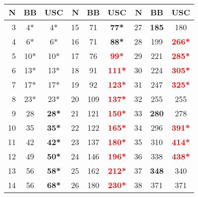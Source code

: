 \begin{table}[t]\scriptsize
\begin{tabular}{r|cc||r|cc||r|cc}
 \hline
 N&BB &USC&N&BB&USC&N&BB&USC\\
 \hline
 3&4*&4*&    15&71&\textbf{77*}&
 27&\textbf{185}&180 \\
 4&6*&6*&    16&71&\textbf{88*}&
 28&199&\textbf{\textcolor{red}{266*}} \\
 5&10*&10*&    17&76&\textbf{\textcolor{red}{99*}}&
 29&221&\textbf{\textcolor{red}{285*}} \\
 6&13*&13*&    18&91&\textbf{\textcolor{red}{111*}}&
 30&224&\textbf{\textcolor{red}{305*}} \\
 7&17*&17*&    19&92&\textbf{\textcolor{red}{123*}}&
 31&247&\textbf{\textcolor{red}{325*}} \\
 8&23*&23*&    20&109&\textbf{\textcolor{red}{137*}}&
 32&255&255 \\
 9&28&\textbf{28*}&    21&121&\textbf{\textcolor{red}{150*}}&
 33&\textbf{280}&278 \\
 10&35&\textbf{35*}&    22&122&\textbf{\textcolor{red}{165*}}&
 34&296&\textbf{\textcolor{red}{391*}} \\
 11&42&\textbf{42*}&    23&137&\textbf{\textcolor{red}{180*}}&
 35&310&\textbf{\textcolor{red}{414*}} \\
 12&49&\textbf{50*}&    24&146&\textbf{\textcolor{red}{196*}}&
 36&338&\textbf{\textcolor{red}{438*}} \\
 13&56&\textbf{58*}&    25&162&\textbf{\textcolor{red}{212*}}&
 37&\textbf{348}&340 \\
 14&56&\textbf{68*}&    26&180&\textbf{\textcolor{red}{230*}}&
 38&371&371 \\ 
\end{tabular}
\end{table}
